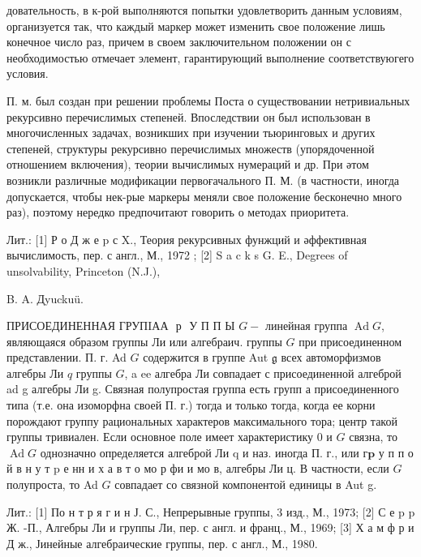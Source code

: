\documentclass[10pt]{article}
\begin{document}
довательность, в к-рой выполняются попытки удовлетворить данным условиям, организуется так, что каждый маркер может изменить свое положение лишь конечное число раз, причем в своем заключительном положении он с необходимостью отмечает элемент, гарантирующий выполнение соответствуюгего условия.



П. м. был создан при решении проблемы Поста о существовании нетривиальных рекурсивно перечислимых степеней. Впоследствии он был использован в многочисленных задачах, возникших при изучении тьюринговых и других степеней, структуры рекурсивно перечислимых множеств (упорядоченной отношением включения), теории вычислимых нумераций и др. При әтом возникли различные модификации первоғачального П. М. (в частности, иногда допускается, чтобы нек-рые маркеры меняли свое положение бесконечно много раз), поэтому нередко предпочитают говорить о методах приоритета.



Лит.: [1] Р о Д ж е p с X., Теория рекурсивных фунжций и әффективная вычислимость, пер. с англ., М., 1972 ; [2] S a c k s G. E., Degrees of unsolvability, Princeton (N.J.),

B. A. Дyuckuü.



ПРИСОЕДИНЕННАЯ ГРУПIАА $\boldsymbol{\text { р }}$ У П П Ы $G-$ линейная группа $\operatorname{Ad} G$, являющаяся образом группы Ли или алгебраич. группы $G$ при присоединенном представлении. П. г. Ad $G$ содержится в группе Aut $\mathfrak{g}$ всех автоморфизмов алгебры Ли $q$ группы $G$, a ee алгебра Ли совпадает с присоединенной алгеброй ad g алгебры Ли g. Связная полупростая группа есть групп а присоединенного типа (т.е. она изоморфна своей П. г.) тогда и только тогда, когда ее корни порождают группу рациональных характеров максимального тора; центр такой группы тривиален. Если основное поле имеет характеристику 0 и $G$ связна, то $\operatorname{Ad} G$ однозначно определяется алгеброй Ли q и наз. иногда П. г., или $г \mathbf{p}$ у п п о й в н у т $\mathrm{p}$ е нн и х а в т о мо р фи и мо в, алгебры Ли ц. В частности, если $G$ полупроста, то Ad $G$ совпадает со связной компонентой единицы в Aut g.



Лит.: [1] По н т р я г и н Ј. С., Непрерывные группы, 3 изд., М., 1973; [2] С е p p Ж. -П., Алгебры Ли и группы Ли, пер. с англ. и франц., М., 1969; [3] Х а м ф р и Д ж., Јинейные алгебраические группы, пер. с англ., М., 1980.
\end{document}
